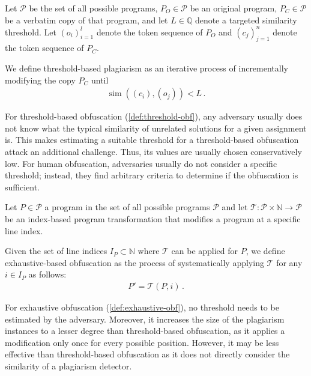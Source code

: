 \begin{theorem}\label{def:threshold-obf} 
Let \(\mathcal{P}\) be the set of all possible programs, \(P_O \in \mathcal{P}\) be an original program, \(P_C \in \mathcal{P}\) be a verbatim copy of that program, and let \(L \in \mathbb{Q}\) denote a targeted similarity threshold.
Let \((o_i)_{i=1}^l\) denote the token sequence of \(P_O\) and \((c_j)_{j=1}^n\) denote the token sequence of \(P_C\).

We define threshold-based plagiarism as an iterative process of incrementally modifying the copy \(P_C\)
until
\begin{align*}
    \operatorname{sim}((c_i), (o_j)) < L \,.
\end{align*}
\end{theorem}

For threshold-based obfuscation (\autoref{def:threshold-obf}), any adversary usually does not know what the typical similarity of unrelated solutions for a given assignment is.
This makes estimating a suitable threshold for a threshold-based obfuscation attack an additional challenge. Thus, its values are usually chosen conservatively low. For human obfuscation, adversaries usually do not consider a specific threshold; instead, they find arbitrary criteria to determine if the obfuscation is sufficient.

\begin{theorem}\label{def:exhaustive-obf}
Let \(P \in \mathcal{P}\) a program in the set of all possible programs \(\mathcal{P}\) and let \(\mathcal{T} : \mathcal{P} \times \mathbb{N} \rightarrow \mathcal{P}\) be an index-based program transformation that modifies a program at a specific line index.

Given the set of line indices \(I_P \subset \mathbb{N}\) where \(\mathcal{T}\) can be applied for \(P\), we define exhaustive-based obfuscation as the process of systematically applying \(\mathcal{T}\) for any \(i \in I_P\) as follows:
\begin{align*}
    P' = \mathcal{T}(P, i) \,.
\end{align*}
\end{theorem}

For exhaustive obfuscation (\autoref{def:exhaustive-obf}), no threshold needs to be estimated by the adversary. Moreover, it increases the size of the plagiarism instances to a lesser degree than threshold-based obfuscation, as it applies a modification only once for every possible position.
However, it may be less effective than threshold-based obfuscation as it does not directly consider the similarity of a plagiarism detector.

